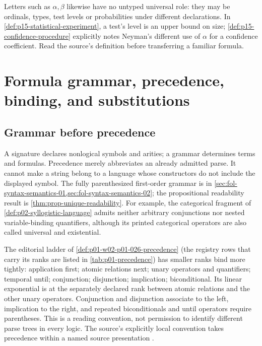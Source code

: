 Letters such as \(\alpha,\beta\) likewise have no untyped universal role:
they may be ordinals, types, test levels or probabilities under different
declarations. In \cref{def:p15-statistical-experiment}, a test's level is an
upper bound on size; \cref{def:p15-confidence-procedure} explicitly notes
Neyman's different use of \(\alpha\) for a confidence coefficient.
Read the source's definition before transferring a familiar formula.

\section{Formula grammar, precedence, binding, and substitutions}
\label{sec:p14-glossary-grammar}

\subsection{Grammar before precedence}

A signature declares nonlogical symbols and arities; a grammar determines
terms and formulas. Precedence merely abbreviates an already admitted parse.
It cannot make a string belong to a language whose constructors do not include
the displayed symbol. The fully parenthesized first-order grammar is in
\cref{sec:fol-syntax-semantics-01,sec:fol-syntax-semantics-02}; the
propositional readability result is \cref{thm:prop-unique-readability}.
For example, the categorical fragment of
\cref{def:p02-syllogistic-language} admits neither arbitrary conjunctions
nor nested variable-binding quantifiers, although its printed categorical
operators are also called universal and existential.

The editorial ladder of \cref{def:p01-w02-p01-026-precedence} (the
registry rows that carry its ranks are listed in \cref{tab:p01-precedence})
has smaller ranks bind more tightly: application first; atomic relations
next; unary operators and quantifiers; temporal until; conjunction;
disjunction; implication; biconditional. Its linear exponential is at the
separately declared rank between atomic relations and the other unary
operators. Conjunction and disjunction associate to the left, implication
to the right, and repeated biconditionals and until operators require
parentheses. This is a reading
convention, not permission to identify different parse trees in every logic.
The source's explicitly local convention takes precedence within a named
source presentation \cite{WhiteheadRussell1910,Lukasiewicz1929,
HilbertAckermann1928,Gentzen1934a}.

